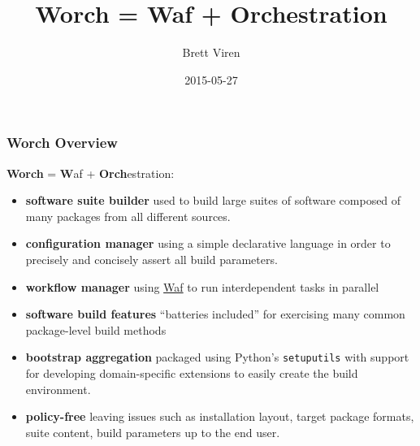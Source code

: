 \documentclass[xcolor=dvipsnames]{beamer}
\author{Brett Viren}
\institute[BNL]
{
  Physics Department

    \texttt{[image: ../common/bnl-logo]}
}
\title{Worch = Waf + Orchestration}
\date{2015-05-27}
\begin{document}
\begin{frame}
  \frametitle{Worch Overview}

  \textbf{Worch} = \textbf{W}af + \textbf{Orch}estration:

  \begin{itemize}
  \item \textbf{software suite builder} used to build large suites of
    software composed of many packages from all different sources.
  \item \textbf{configuration manager} using a simple declarative
    language in order to precisely and concisely assert all build
    parameters.
  \item \textbf{workflow manager} using \href{https://waf.io}{Waf} to
    run interdependent tasks in parallel
  \item \textbf{software build features} ``batteries included'' for
    exercising many common package-level build methods
  \item \textbf{bootstrap aggregation} packaged using Python's
    \texttt{setuputils} with support for developing domain-specific
    extensions to easily create the build environment.
  \item \textbf{policy-free} leaving issues such as installation
    layout, target package formats, suite content, build parameters up
    to the end user.
  \end{itemize}

\end{frame}
\end{document}
